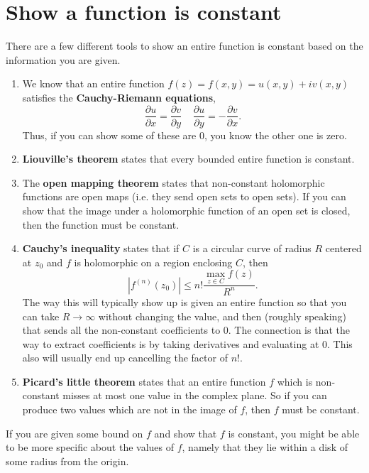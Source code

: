 \documentclass[10pt]{article}
\begin{document}
\section{Show a function is constant}

There are a few different tools to show an entire function is constant based on the information you are given.

\begin{enumerate}
\item We know that an entire function $f(z) = f(x,y) = u(x,y) + i v(x,y)$ satisfies the \textbf{Cauchy-Riemann equations},
\[ \frac{\partial u}{\partial x} = \frac{\partial v}{\partial y} \; \; \; \; \frac{\partial u}{\partial y} = - \frac{\partial v}{\partial x} .\]
Thus, if you can show some of these are $0$, you know the other one is zero.

\item \textbf{Liouville's theorem} states that every bounded entire function is constant.
\item The \textbf{open mapping theorem} states that non-constant holomorphic functions are open maps (i.e. they send open sets to open sets). If you can show that the image under a holomorphic function of an open set is closed, then the function must be constant.

\item \textbf{Cauchy's inequality} states that if $C$ is a circular curve of radius $R$ centered at $z_0$ and $f$ is holomorphic on a region enclosing $C$, then
\[ | f^{(n)}(z_0) | \leq n! \frac{\max_{z \in C} f(z)}{R^n}.\]
The way this will typically show up is given an entire function so that you can take $R \rightarrow \infty$ without changing the value, and then (roughly speaking) that sends all the non-constant coefficients to $0$. The connection is that the way to extract coefficients is by taking derivatives and evaluating at $0$. This also will usually end up cancelling the factor of $n!$.

\item \textbf{Picard's little theorem} states that an entire function $f$ which is non-constant misses at most one value in the complex plane. So if you can
produce two values which are not in the image of $f$, then $f$ must be constant.

\end{enumerate}

If you are given some bound on $f$ and show that $f$ is constant, you might be able to be more specific about the values of $f$, namely that 
they lie within a disk of some radius from the origin.
\end{document}
